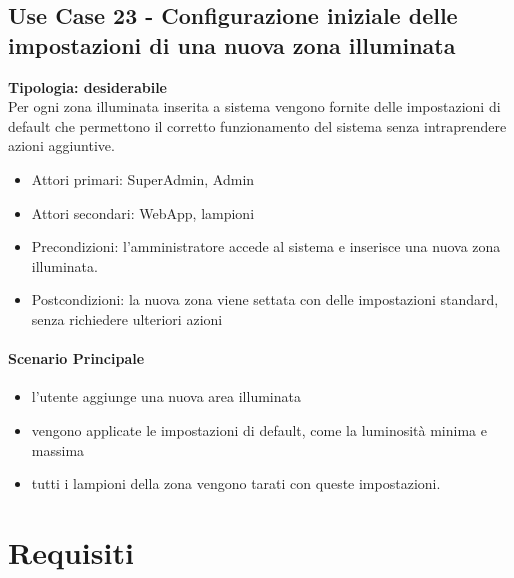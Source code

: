 \documentclass[12pt]{article}
\begin{document}
\subsection{Use Case 23 - Configurazione iniziale delle impostazioni di una nuova zona illuminata}
\textbf{Tipologia: desiderabile} \\
Per ogni zona illuminata inserita a sistema vengono fornite delle impostazioni di default che permettono il corretto funzionamento del sistema senza intraprendere azioni aggiuntive.
\begin{itemize}
	\item Attori primari: SuperAdmin, Admin
	\item Attori secondari: WebApp, lampioni
	\item Precondizioni: l'amministratore accede al sistema e inserisce una nuova zona illuminata.
	\item Postcondizioni: la nuova zona viene settata con delle impostazioni standard, senza richiedere ulteriori azioni
\end{itemize}
\paragraph{Scenario Principale}
\begin{itemize}
	\item l'utente aggiunge una nuova area illuminata
	\item vengono applicate le impostazioni di default, come la luminosità minima e massima
	\item tutti i lampioni della zona vengono tarati con queste impostazioni.
\end{itemize}
\section{Requisiti}
\end{document}
